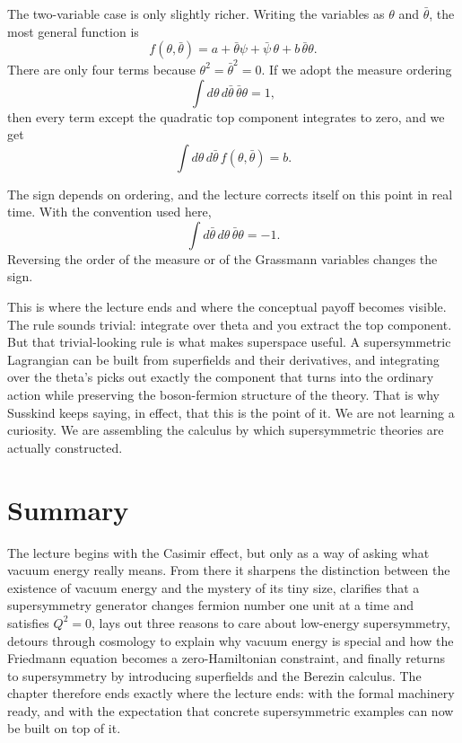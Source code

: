 The two-variable case is only slightly richer. Writing the variables as \(\theta\) and \(\bar\theta\), the most general function is
\begin{equation}
f(\theta,\bar\theta)=a+\bar\theta\psi+\bar\psi\,\theta+b\,\bar\theta\theta.
\end{equation}
There are only four terms because \(\theta^2=\bar\theta^2=0\). If we adopt the measure ordering
\begin{equation}
\int d\theta\,d\bar\theta\,\bar\theta\theta=1,
\end{equation}
then every term except the quadratic top component integrates to zero, and we get
\begin{equation}
\int d\theta\,d\bar\theta\,f(\theta,\bar\theta)=b.
\end{equation}

\begin{remark}
The sign depends on ordering, and the lecture corrects itself on this point in real time. With the convention used here,
\[
\int d\bar\theta\,d\theta\,\bar\theta\theta=-1.
\]
Reversing the order of the measure or of the Grassmann variables changes the sign.
\end{remark}

This is where the lecture ends and where the conceptual payoff becomes visible. The rule sounds trivial: integrate over theta and you extract the top component. But that trivial-looking rule is what makes superspace useful. A supersymmetric Lagrangian can be built from superfields and their derivatives, and integrating over the theta's picks out exactly the component that turns into the ordinary action while preserving the boson-fermion structure of the theory. That is why Susskind keeps saying, in effect, that this is the point of it. We are not learning a curiosity. We are assembling the calculus by which supersymmetric theories are actually constructed.

\section{Summary}

The lecture begins with the Casimir effect, but only as a way of asking what vacuum energy really means. From there it sharpens the distinction between the existence of vacuum energy and the mystery of its tiny size, clarifies that a supersymmetry generator changes fermion number one unit at a time and satisfies \(Q^2=0\), lays out three reasons to care about low-energy supersymmetry, detours through cosmology to explain why vacuum energy is special and how the Friedmann equation becomes a zero-Hamiltonian constraint, and finally returns to supersymmetry by introducing superfields and the Berezin calculus. The chapter therefore ends exactly where the lecture ends: with the formal machinery ready, and with the expectation that concrete supersymmetric examples can now be built on top of it.